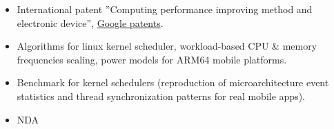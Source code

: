 
    \begin{itemize}
        \item International patent ''Computing performance improving method and electronic device'',
            \href{https://patents.google.com/patent/WO2025029163A1}{Google patents}.
        \smallskip
        \item Algorithms for linux kernel scheduler, workload-based CPU \& memory frequencies
            scaling, power models for ARM64 mobile platforms.
        \item Benchmark for kernel schedulers (reproduction of microarchitecture event statistics and thread
            synchronization patterns for real mobile apps).
    \end{itemize}

    \begin{itemize}
        \item NDA
    \end{itemize}

    \smallskip

